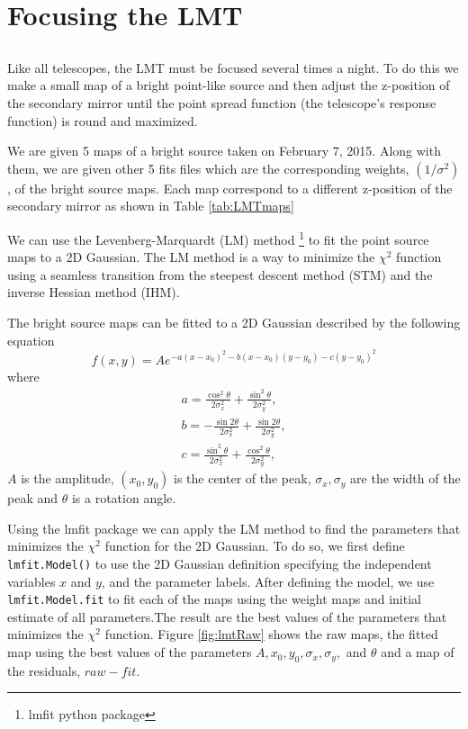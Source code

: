 \section{Focusing the LMT}

\subsection{}
Like all telescopes, the LMT must be focused several times a night.
To do this we make a small map of a bright point-like source and then adjust the z-position of the secondary mirror until the point spread function (the telescope’s response function) is round and maximized. 

We are given 5 maps of a bright source taken on February 7, 2015. Along with them, we are given other 5 fits files which are the corresponding weights, $(1/\sigma^2)$, of the bright source maps. Each map correspond to a different z-position of the secondary mirror as shown in Table \ref{tab:LMTmaps}

We can use the Levenberg-Marquardt (LM) method \footnote{lmfit python package} to fit the point source maps to a 2D Gaussian. The LM method is a way to minimize the $\chi^2$ function using a seamless transition from the steepest descent method (STM) and the inverse Hessian method (IHM).

The bright source maps can be fitted to a 2D Gaussian described by the following equation
\begin{equation}
    f(x,y)=Ae^{-a(x-x_0)^2-b(x-x_0)(y-y_0)-c(y-y_0)^2}
\end{equation}
where 
\begin{align}
    a=\frac{\cos^2\theta}{2\sigma_x^2}+\frac{\sin^2\theta}{2\sigma_y^2},\\
    b=-\frac{\sin 2\theta}{2\sigma_x^2}+\frac{\sin 2\theta}{2\sigma_y^2},\\
    c=\frac{\sin^2\theta}{2\sigma_x^2}+\frac{\cos^2\theta}{2\sigma_y^2},
\end{align}
$A$ is the amplitude, $(x_0,y_0)$ is the center of the peak, $\sigma_x,\sigma_y$ are the width of the peak and $\theta$ is a rotation angle.

Using the lmfit package we can apply the LM method to find the parameters that minimizes the $\chi^2$ function for the 2D Gaussian. To do so, we first define \lstinline{lmfit.Model()} to use the 2D Gaussian definition specifying the independent variables $x$ and $y$, and the parameter labels. After defining the model, we use \lstinline{lmfit.Model.fit} to fit each of the maps using the weight maps and initial estimate of all parameters.The result are the best values of the parameters that minimizes the $\chi^2$ function. 
Figure \ref{fig:lmtRaw} shows the raw maps, the fitted map using the best values of the parameters $A,x_0,y_0,\sigma_x,\sigma_y,$ and $\theta$ and a map of the residuals, $raw-fit$. 

